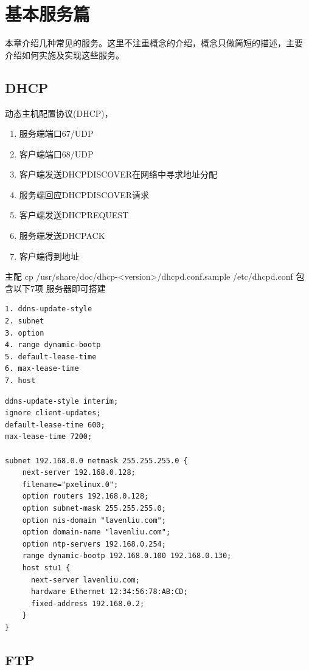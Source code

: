 \part{基本服务篇}

本章介绍几种常见的服务。这里不注重概念的介绍，概念只做简短的描述，主要
介绍如何实施及实现这些服务。

\chapter{DHCP}

动态主机配置协议(DHCP)，

\begin{enumerate}[itemsep=0pt,parsep=0pt]
\item 服务端端口67/UDP
\item 客户端端口68/UDP
\item 客户端发送DHCPDISCOVER在网络中寻求地址分配
\item 服务端回应DHCPDISCOVER请求
\item 客户端发送DHCPREQUEST
\item 服务端发送DHCPACK
\item 客户端得到地址
\end{enumerate}

主配 cp /usr/share/doc/dhcp-<version>/dhcpd.conf.sample /etc/dhcpd.conf
包含以下7项 服务器即可搭建

\small{
\begin{verbatim}
1. ddns-update-style
2. subnet
3. option
4. range dynamic-bootp
5. default-lease-time
6. max-lease-time
7. host
\end{verbatim}
}
\normalsize

\small{
\begin{verbatim}
ddns-update-style interim;
ignore client-updates;
default-lease-time 600;
max-lease-time 7200;

subnet 192.168.0.0 netmask 255.255.255.0 {
    next-server 192.168.0.128;
    filename="pxelinux.0";
    option routers 192.168.0.128;
    option subnet-mask 255.255.255.0;
    option nis-domain "lavenliu.com";
    option domain-name "lavenliu.com";
    option ntp-servers 192.168.0.254;
    range dynamic-bootp 192.168.0.100 192.168.0.130;
    host stu1 {
      next-server lavenliu.com;
      hardware Ethernet 12:34:56:78:AB:CD;
      fixed-address 192.168.0.2;
    }
}
\end{verbatim}
}
\normalsize

\chapter{FTP}

